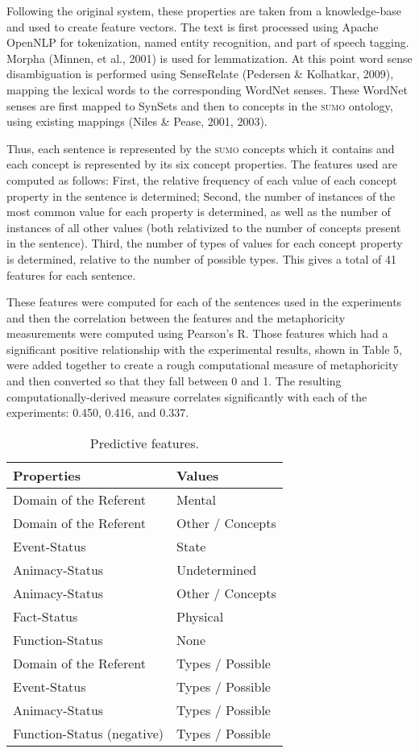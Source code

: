 \documentclass[11pt]{article}
\begin{document}
Following the original system, these properties are taken from a knowledge-base and used to create feature vectors. The text is first processed using Apache OpenNLP for tokenization, named entity recognition, and part of speech tagging. Morpha (Minnen, et al., 2001) is used for lemmatization. At this point word sense disambiguation is performed using SenseRelate (Pedersen \& Kolhatkar, 2009), mapping the lexical words to the corresponding WordNet senses. These WordNet senses are first mapped to SynSets and then to concepts in the \textsc{sumo} ontology, using existing mappings (Niles \& Pease, 2001, 2003).

Thus, each sentence is represented by the \textsc{sumo} concepts which it contains and each concept is represented by its six concept properties. The features used are computed as follows: First, the relative frequency of each value of each concept property in the sentence is determined; Second, the number of instances of the most common value for each property is determined, as well as the number of instances of all other values (both relativized to the number of concepts present in the sentence). Third, the number of types of values for each concept property is determined, relative to the number of possible types. This gives a total of 41 features for each sentence.

These features were computed for each of the sentences used in the experiments and then the correlation between the features and the metaphoricity measurements were computed using Pearson's R. Those features which had a significant positive relationship with the experimental results, shown in Table 5, were added together to create a rough computational measure of metaphoricity and then converted so that they fall between 0 and 1. The resulting computationally-derived measure correlates significantly with each of the experiments: 0.450, 0.416, and 0.337.

\begin{table}[h]
\begin{center}
\begin{tabular}{|l|l|}
\hline \bf Properties & \bf Values \\ \hline
Domain of the Referent & Mental \\
Domain of the Referent & Other / Concepts \\
Event-Status & State \\
Animacy-Status & Undetermined \\
Animacy-Status & Other / Concepts \\
Fact-Status & Physical \\
Function-Status & None \\
Domain of the Referent & Types / Possible \\
Event-Status & Types / Possible \\
Animacy-Status & Types / Possible \\
Function-Status (negative) & Types / Possible \\
\hline
\end{tabular}
\end{center}
\caption{\label{font-table} Predictive features. }
\end{table}
\end{document}
